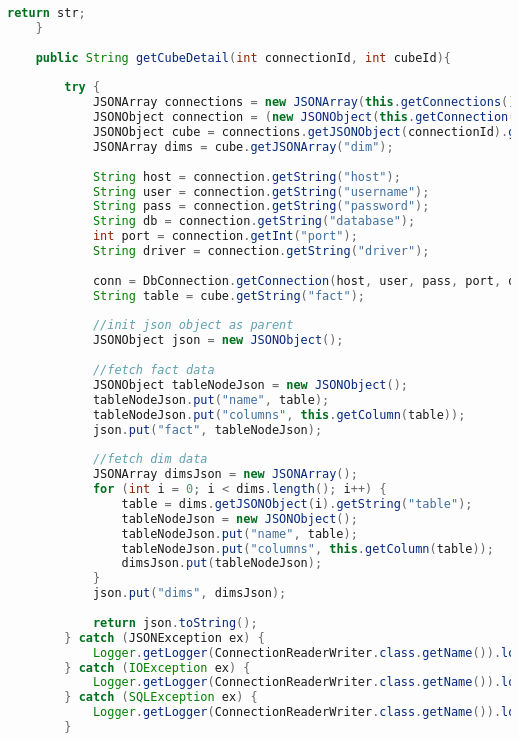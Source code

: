\begin{lstlisting}[language=Java,basicstyle=\tiny,caption=ConnectionReaderWriter.java]
        return str;
    }
        
    public String getCubeDetail(int connectionId, int cubeId){
        
        try {
            JSONArray connections = new JSONArray(this.getConnections());
            JSONObject connection = (new JSONObject(this.getConnection(connectionId))).getJSONObject("connection");
            JSONObject cube = connections.getJSONObject(connectionId).getJSONArray("cubes").getJSONObject(cubeId);
            JSONArray dims = cube.getJSONArray("dim");
            
            String host = connection.getString("host");
            String user = connection.getString("username");
            String pass = connection.getString("password");
            String db = connection.getString("database");
            int port = connection.getInt("port");
            String driver = connection.getString("driver");
            
            conn = DbConnection.getConnection(host, user, pass, port, db, driver);
            String table = cube.getString("fact");
            
            //init json object as parent
            JSONObject json = new JSONObject();
            
            //fetch fact data
            JSONObject tableNodeJson = new JSONObject();
            tableNodeJson.put("name", table);
            tableNodeJson.put("columns", this.getColumn(table));            
            json.put("fact", tableNodeJson);
            
            //fetch dim data
            JSONArray dimsJson = new JSONArray();
            for (int i = 0; i < dims.length(); i++) {
                table = dims.getJSONObject(i).getString("table");
                tableNodeJson = new JSONObject();
                tableNodeJson.put("name", table);
                tableNodeJson.put("columns", this.getColumn(table)); 
                dimsJson.put(tableNodeJson);
            }
            json.put("dims", dimsJson);
            
            return json.toString();
        } catch (JSONException ex) {
            Logger.getLogger(ConnectionReaderWriter.class.getName()).log(Level.SEVERE, null, ex);
        } catch (IOException ex) {
            Logger.getLogger(ConnectionReaderWriter.class.getName()).log(Level.SEVERE, null, ex);
        } catch (SQLException ex) {
            Logger.getLogger(ConnectionReaderWriter.class.getName()).log(Level.SEVERE, null, ex);
        } 
        

\end{lstlisting}
